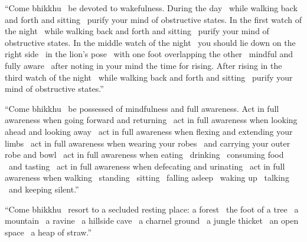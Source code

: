 \begin{justify}
“Come bhikkhu \breathmark\ be devoted to wakefulness. During the day \breathmark\ while walking back and forth and sitting \breathmark\ purify your mind of obstructive states. In the first watch of the night \breathmark\ while walking back and forth and sitting \breathmark\ purify your mind of obstructive states. In the middle watch of the night \breathmark\ you should lie down on the right side \breathmark\ in the lion’s pose \breathmark\ with one foot overlapping the other \breathmark\ mindful and fully aware \breathmark\ after noting in your mind the time for rising. After rising in the third watch of the night \breathmark\ while walking back and forth and sitting \breathmark\ purify your mind of obstructive states.”
\end{justify}

\begin{justify}
“Come bhikkhu \breathmark\ be possessed of mindfulness and full awareness. Act in full awareness when going forward and returning \breathmark\ act in full awareness when looking ahead and looking away \breathmark\ act in full awareness when flexing and extending your limbs \breathmark\ act in full awareness when wearing your robes \breathmark\ and carrying your outer robe and bowl \breathmark\ act in full awareness when eating \breathmark\ drinking \breathmark\ consuming food \breathmark\ and tasting \breathmark\ act in full awareness when defecating and urinating \breathmark\ act in full awareness when walking \breathmark\ standing \breathmark\ sitting \breathmark\ falling asleep \breathmark\ waking up
\breathmark\ talking \breathmark\ and keeping silent.”
\end{justify}

\begin{justify}
“Come bhikkhu \breathmark\ resort to a secluded resting place: a forest \breathmark\ the foot of a tree \breathmark\ a mountain \breathmark\ a ravine \breathmark\ a hillside cave \breathmark\ a charnel ground \breathmark\ a jungle thicket \breathmark\ an open space \breathmark\ a heap of straw.”
\end{justify}

